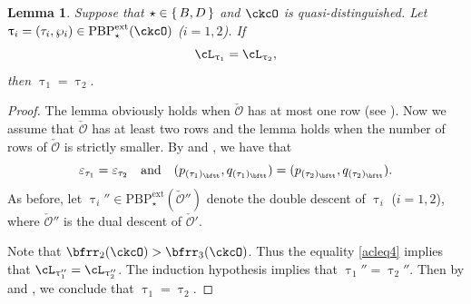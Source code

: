 \documentclass[11pt,a4paper]{amsart}
\newcommand{\CO}{{\mathcal {O}}}
\newcommand{\be}{\begin {equation}}
\newcommand{\ee}{\end {equation}}
\numberwithin{equation}{section}
\newtheorem{lem}[thm]{Lemma}
\theoremstyle{remark}
\def\PBPe{\mathrm{PBP}^{\mathrm{ext}}}
\def\PBPes{\mathrm{PBP}^{\mathrm{ext}}_{\star}}
\def\AND{\quad\text{and}\quad}
\def\ac{\cL}
\begin{document}
\begin{lem}\label{lem:BD2222}
Suppose that $\star \in \set{B,D}$ and
$\ckcO$ is quasi-distinguished. Let $\uptau_i=(\tau_i, \wp_i)\in \PBPe_\star(\ckcO)$
  ($i=1,2$). If
  \be\label{acleq4}
    \ac_{\uptau_1}= \ac_{\uptau_2},
  \ee
  then
  $
  \uptau_{1}=\uptau_{2}.
  $
\end{lem}
\begin{proof}
The lemma obviously holds when $\check \CO$ has at most one row (see ).  Now we assume that $\check \CO$ has at least two rows and the lemma holds when the number of rows of $\check \CO$ is strictly smaller.
By  and  ,  we have that
  \[
   \varepsilon_{\tau_1}=\varepsilon_{\tau_2} \AND  (p_{(\tau_1)_\bftt}, q_{(\tau_1)_\bftt}) =(p_{(\tau_2)_\bftt}, q_{(\tau_2)_\bftt}).
  \]
As before, let  $\uptau_i''\in \PBPes(\check \CO'')$ denote the double descent of $\uptau_i$ ($i=1,2$), where $\check \CO''$ is the dual descent of $\check \CO'$.

Note that $\bfrr_2(\ckcO)>\bfrr_3(\ckcO)$. Thus the equality \eqref{acleq4} implies that
$\ac_{\uptau_1''}=\ac_{\uptau_2''}$.
The induction hypothesis implies that $\uptau_1''=\uptau_2''$. Then by  and , we conclude that $\uptau_1=\uptau_2$.
\end{proof}
\end{document}
